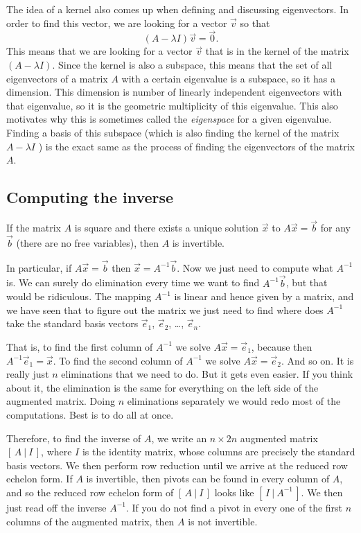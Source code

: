 \documentclass{ximera}
\begin{document}
The idea of a kernel also comes up when defining and discussing eigenvectors. In order to find this vector, we are looking for a vector $\vec{v}$ so that
\[ 
    (A - \lambda I)\vec{v} = \vec{0}.
\] 
This means that we are looking for a vector $\vec{v}$ that is in the kernel of the matrix $(A - \lambda I)$. Since the kernel is also a subspace, this means that the set of all eigenvectors of a matrix $A$ with a certain eigenvalue is a subspace, so it has a dimension. This dimension is number of linearly independent eigenvectors with that eigenvalue, so it is the geometric multiplicity of this eigenvalue. This also motivates why this is sometimes called the \emph{eigenspace} for a given eigenvalue. Finding a basis of this subspace (which is also finding the kernel of the matrix $A - \lambda I$ ) is the exact same as the process of finding the eigenvectors of the matrix $A$. 

\subsection{Computing the inverse}

If the matrix $A$ is square and there exists a unique solution $\vec{x}$ to $A \vec{x} = \vec{b}$ for any $\vec{b}$ (there are no free variables), then $A$ is invertible.

In particular, if $A \vec{x} = \vec{b}$ then $\vec{x} = A^{-1} \vec{b}$. Now we just need to compute what $A^{-1}$ is.  We can surely  do elimination every time we want to find $A^{-1} \vec{b}$, but that would be ridiculous.  The mapping $A^{-1}$ is linear and hence given by a matrix, and we have seen that to figure out the matrix we just need to find where does $A^{-1}$ take the standard basis vectors $\vec{e}_1$, $\vec{e}_2$, \ldots, $\vec{e}_n$.

That is, to find the first column of $A^{-1}$ we solve $A \vec{x} = \vec{e}_1$, because then $A^{-1} \vec{e}_1 = \vec{x}$. To find the second column of $A^{-1}$ we solve $A \vec{x} = \vec{e}_2$.  And so on.  It is really just $n$ eliminations that we need to do.  But it gets even easier. If you think about it, the elimination is the same for everything on the left side of the augmented matrix.  Doing $n$ eliminations separately we would redo most of the computations. Best is to do all at once.

Therefore, to find the inverse of $A$, we write an $n \times 2n$ augmented matrix $[ \,A ~|~ I\, ]$, where $I$ is the identity matrix, whose columns are precisely the standard basis vectors. We then perform row reduction until we arrive at the reduced row echelon form.  If $A$ is invertible, then pivots can be found in every column of $A$, and so the reduced row echelon form of $[ \,A ~|~ I\, ]$ looks like $[ \,I ~|~ A^{-1}\, ]$. We then just read off the inverse $A^{-1}$. If you do not find a pivot in every one of the first $n$ columns of the augmented matrix, then $A$ is not invertible.
\end{document}
